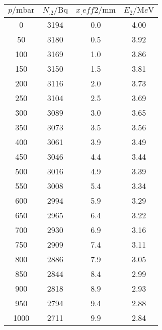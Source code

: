 \label{tab:tab2}
	\begin{tabular}{S[table-format=3.0]S[table-format=3.0]S[table-format=2.1]S[table-format=1.2]}
		\toprule
		{$p/\si{\milli\bar}$} & {$N_.2/\si{\becquerel}$} & {$x_.{eff2}/\si{\milli\metre}$} & {$E_2/\si{\mega e\volt}$} \\
		 & 3194 & 0.0 & 4.00 \\
		 50 & 3180 & 0.5 & 3.92 \\
		100 & 3169 & 1.0 & 3.86 \\
		150 & 3150 & 1.5 & 3.81 \\
		200 & 3116 & 2.0 & 3.73 \\
		250 & 3104 & 2.5 & 3.69 \\
		300 & 3089 & 3.0 & 3.65 \\
		350 & 3073 & 3.5 & 3.56 \\
		400 & 3061 & 3.9 & 3.49 \\
		450 & 3046 & 4.4 & 3.44 \\
		500 & 3016 & 4.9 & 3.39 \\
		550 & 3008 & 5.4 & 3.34 \\
		600 & 2994 & 5.9 & 3.29 \\
		650 & 2965 & 6.4 & 3.22 \\
		700 & 2930 & 6.9 & 3.16 \\
		750 & 2909 & 7.4 & 3.11 \\
		800 & 2886 & 7.9 & 3.05 \\
		850 & 2844 & 8.4 & 2.99 \\
		900 & 2818 & 8.9 & 2.93 \\
		950 & 2794 & 9.4 & 2.88 \\
		1000 & 2711 & 9.9 & 2.84 \\
		\bottomrule
	\end{tabular}
